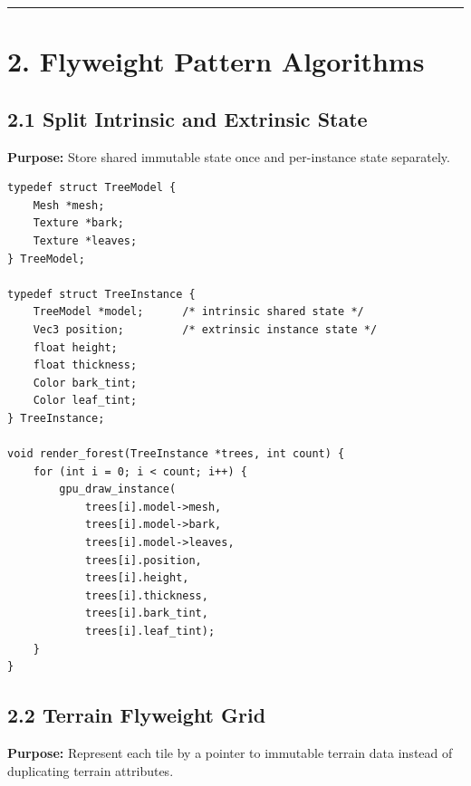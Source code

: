 \documentclass[10pt,letterpaper]{article}
\begin{document}
\medskip\hrule\medskip

\clearpage
\section{2. Flyweight Pattern Algorithms}

\subsection{2.1 Split Intrinsic and Extrinsic State}

\textbf{Purpose:} Store shared immutable state once and per-instance state separately.

\begin{verbatim}
typedef struct TreeModel {
    Mesh *mesh;
    Texture *bark;
    Texture *leaves;
} TreeModel;

typedef struct TreeInstance {
    TreeModel *model;      /* intrinsic shared state */
    Vec3 position;         /* extrinsic instance state */
    float height;
    float thickness;
    Color bark_tint;
    Color leaf_tint;
} TreeInstance;

void render_forest(TreeInstance *trees, int count) {
    for (int i = 0; i < count; i++) {
        gpu_draw_instance(
            trees[i].model->mesh,
            trees[i].model->bark,
            trees[i].model->leaves,
            trees[i].position,
            trees[i].height,
            trees[i].thickness,
            trees[i].bark_tint,
            trees[i].leaf_tint);
    }
}
\end{verbatim}

\subsection{2.2 Terrain Flyweight Grid}

\textbf{Purpose:} Represent each tile by a pointer to immutable terrain data instead of duplicating terrain attributes.
\end{document}
